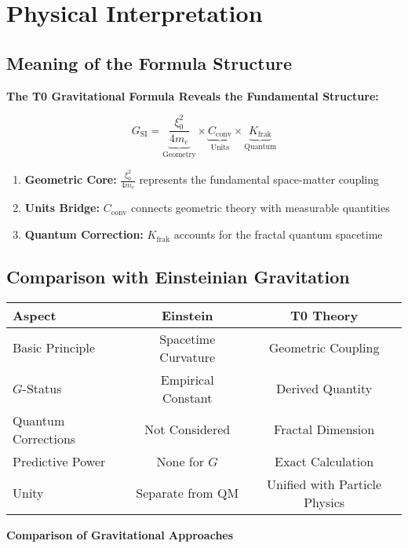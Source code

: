 \documentclass[12pt,a4paper]{article}
\begin{document}
	\section{Physical Interpretation}
	
	\subsection{Meaning of the Formula Structure}
	
	\begin{keyresult}
		\textbf{The T0 Gravitational Formula Reveals the Fundamental Structure:}
		
		\begin{equation}
			G_{\text{SI}} = \underbrace{\frac{\xi_0^2}{4 m_e}}_{\text{Geometry}} \times \underbrace{C_{\text{conv}}}_{\text{Units}} \times \underbrace{K_{\text{frak}}}_{\text{Quantum}}
		\end{equation}
		
		\begin{enumerate}
			\item \textbf{Geometric Core:} $\frac{\xi_0^2}{4 m_e}$ represents the fundamental space-matter coupling
			
			\item \textbf{Units Bridge:} $C_{\text{conv}}$ connects geometric theory with measurable quantities
			
			\item \textbf{Quantum Correction:} $K_{\text{frak}}$ accounts for the fractal quantum spacetime
		\end{enumerate}
	\end{keyresult}
	
	\subsection{Comparison with Einsteinian Gravitation}
	
	\begin{center}
		\begin{tabular}{lcc}
			\toprule
			\textbf{Aspect} & \textbf{Einstein} & \textbf{T0 Theory} \\
			\midrule
			Basic Principle & Spacetime Curvature & Geometric Coupling \\
			$G$-Status & Empirical Constant & Derived Quantity \\
			Quantum Corrections & Not Considered & Fractal Dimension \\
			Predictive Power & None for $G$ & Exact Calculation \\
			Unity & Separate from QM & Unified with Particle Physics \\
			\bottomrule
		\end{tabular}
		\par\vspace{0.5em}
		\textbf{Comparison of Gravitational Approaches}
	\end{center}
	
\end{document}
